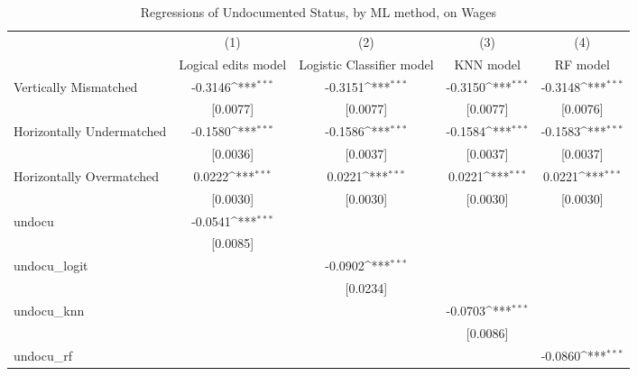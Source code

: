 \begin{table}[htbp]\centering
\def\sym#1{\ifmmode^{#1}\else\(^{#1}\)\fi}
\caption{Regressions of Undocumented Status, by ML method, on Wages}
\begin{tabular}{l*{4}{c}}
\toprule
                    &\multicolumn{1}{c}{(1)}         &\multicolumn{1}{c}{(2)}         &\multicolumn{1}{c}{(3)}         &\multicolumn{1}{c}{(4)}         \\
                    &Logical edits model         &Logistic Classifier model         &   KNN model         &    RF model         \\
\midrule
Vertically Mismatched&     -0.3146\sym{***}&     -0.3151\sym{***}&     -0.3150\sym{***}&     -0.3148\sym{***}\\
                    &    [0.0077]         &    [0.0077]         &    [0.0077]         &    [0.0076]         \\
\addlinespace
Horizontally Undermatched&     -0.1580\sym{***}&     -0.1586\sym{***}&     -0.1584\sym{***}&     -0.1583\sym{***}\\
                    &    [0.0036]         &    [0.0037]         &    [0.0037]         &    [0.0037]         \\
\addlinespace
Horizontally Overmatched&      0.0222\sym{***}&      0.0221\sym{***}&      0.0221\sym{***}&      0.0221\sym{***}\\
                    &    [0.0030]         &    [0.0030]         &    [0.0030]         &    [0.0030]         \\
\addlinespace
undocu              &     -0.0541\sym{***}&                     &                     &                     \\
                    &    [0.0085]         &                     &                     &                     \\
\addlinespace
undocu\_logit        &                     &     -0.0902\sym{***}&                     &                     \\
                    &                     &    [0.0234]         &                     &                     \\
\addlinespace
undocu\_knn          &                     &                     &     -0.0703\sym{***}&                     \\
                    &                     &                     &    [0.0086]         &                     \\
\addlinespace
undocu\_rf           &                     &                     &                     &     -0.0860\sym{***}\\

\end{tabular}
\end{table}
